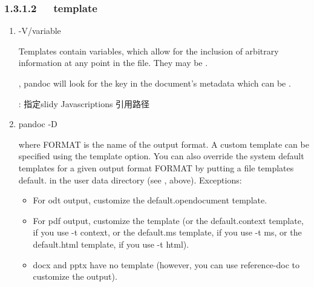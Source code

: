 \documentclass[letterpaper,12pt,english]{sphinxmanual}
\begin{document}
\subsubsection{1.3.1.2   template}
\label{\detokenize{001software/001install/pandoc:template}}\begin{enumerate}
%
\item {} 
-V/\textendash{}variable

Templates contain variables, which allow for the inclusion of
arbitrary information at any point in the file. They may be .

, pandoc will look for the key in the
document’s metadata \textendash{} which can be .

 : 指定slidy Javascriptions 引用路径

\item {} 
pandoc -D 

where FORMAT is the name of the output format. A custom template can
be specified using the \textendash{}template option. You can also override the
system default templates for a given output format FORMAT by putting
a file templates default. in the user data directory (see
, above). Exceptions:
\begin{itemize}
\item {} 
For odt output, customize the default.opendocument template.

\item {} 
For pdf output, customize the  template (or the
default.context template, if you use -t context, or the default.ms
template, if you use -t ms, or the default.html template, if you
use -t html).

\item {} 
docx and pptx have no template (however, you can use
\textendash{}reference-doc to customize the output).

\begin{sphinxVerbatim}[commandchars=\\\{\}]
  \PYGZbs{}\PYGZbs{}    \PYGZbs{}\PYGZbs{}
  \PYGZbs{}\PYGZbs{}    \PYGZbs{}
\end{sphinxVerbatim}


\end{itemize}
\end{enumerate}
\end{document}
